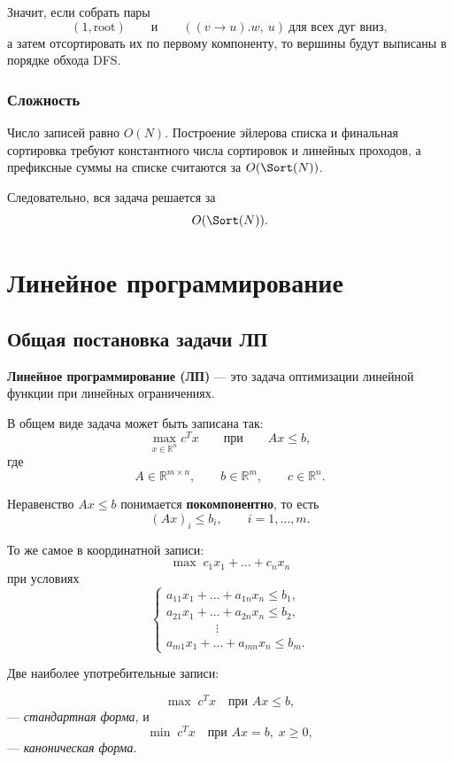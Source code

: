 	Значит, если собрать пары
	\[
	(1,\text{root})
	\qquad\text{и}\qquad
	((v\to u).w,\ u)\ \text{для всех дуг вниз},
	\]
	а затем отсортировать их по первому компоненту, то вершины будут выписаны в порядке обхода DFS.
	
	\subsubsection*{Сложность}
	
	Число записей равно $O(N)$. Построение эйлерова списка и финальная сортировка требуют
	константного числа сортировок и линейных проходов, а префиксные суммы на списке считаются за $O(\Sort(N))$.
	
	Следовательно, вся задача решается за
	\[
	O(\Sort(N)).
	\]
	
	\section*{Линейное программирование}
	
	\subsection{Общая постановка задачи ЛП}
	
	\textbf{Линейное программирование (ЛП)} --- это задача оптимизации линейной функции при линейных ограничениях.
	
	В общем виде задача может быть записана так:
	\[
	\max_{x \in \mathbb{R}^n} c^T x
	\qquad \text{при} \qquad
	Ax \le b,
	\]
	где
	\[
	A \in \mathbb{R}^{m \times n}, \qquad b \in \mathbb{R}^m, \qquad c \in \mathbb{R}^n.
	\]
	
	Неравенство \(Ax \le b\) понимается \textbf{покомпонентно}, то есть
	\[
	(Ax)_i \le b_i, \qquad i=1,\dots,m.
	\]
	
	То же самое в координатной записи:
	\[
	\max \; c_1x_1+\dots+c_nx_n
	\]
	при условиях
	\[
	\begin{cases}
		a_{11}x_1+\dots+a_{1n}x_n \le b_1,\\
		a_{21}x_1+\dots+a_{2n}x_n \le b_2,\\
		\hspace{4em}\vdots\\
		a_{m1}x_1+\dots+a_{mn}x_n \le b_m.
	\end{cases}
	\]
	
 	Две наиболее употребительные записи:
	
	\[
	\max \; c^T x \quad \text{при } Ax \le b,
	\]
	--- \emph{стандартная форма}, и
	\[
	\min \; c^T x \quad \text{при } Ax = b,\; x \ge 0,
	\]
	--- \emph{каноническая форма}.
	
